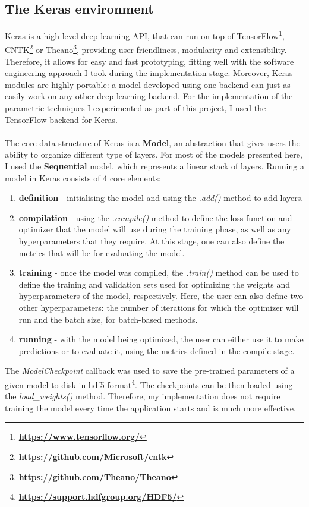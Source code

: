 	\subsection{The Keras environment} \label{Section: impl/ml/ecosys}
	Keras is a high-level deep-learning API, that can run on top of TensorFlow\footnote{\textbf{\url{https://www.tensorflow.org/}}}, CNTK\footnote{\textbf{\url{https://github.com/Microsoft/cntk}}} or Theano\footnote{\textbf{\url{https://github.com/Theano/Theano}}}, providing user friendliness, modularity and extensibility. Therefore, it allows for easy and fast prototyping, fitting well with the software engineering approach I took during the implementation stage. Moreover, Keras modules are highly portable: a model developed using one backend can just as easily work on any other deep learning backend. For the implementation of the parametric techniques I experimented as part of this project, I used the TensorFlow backend for Keras. 
	\\ \\
	The core data structure of Keras is a \textbf{Model}, an abstraction that gives users the ability to organize different type of layers. For most of the models presented here, I used the \textbf{Sequential} model, which represents a linear stack of layers. Running a model in Keras consists of 4 core elements:
	\begin{enumerate}
		\item \textbf{definition} - initialising the model and using the \textit{.add()} method to add layers.
		\item \textbf{compilation} - using the \textit{.compile()} method to define the loss function and optimizer that the model will use during the training phase, as well as any hyperparameters that they require. At this stage, one can also define the metrics that will be for evaluating the model. 
		\item \textbf{training} - once the model was compiled, the \textit{.train()} method can be used to define the training and validation sets used for optimizing the weights and hyperparameters of the model, respectively. Here, the user can also define two other hyperparameters: the number of iterations for which the optimizer will run and the batch size, for batch-based methods. 
		\item \textbf{running} - with the model being optimized, the user can either use it to make predictions or to evaluate it, using the metrics defined in the compile stage. 
	\end{enumerate}
	The \textit{ModelCheckpoint} callback was used to save the pre-trained parameters of a given model to disk in hdf5 format\footnote{\textbf{\url{https://support.hdfgroup.org/HDF5/}}}. The checkpoints can be then loaded using the \textit{load\_weights()} method. Therefore, my implementation does not require training the model every time the application starts and is much more effective. 
	
